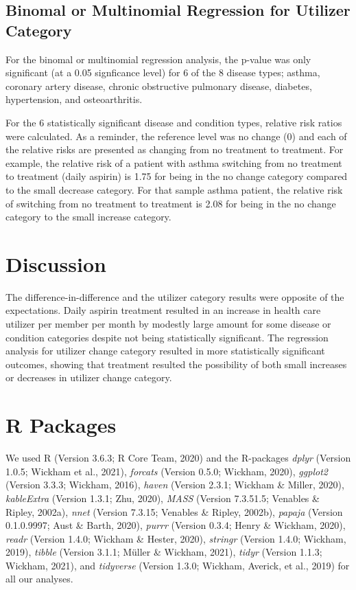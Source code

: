 \documentclass[
  english,
  man]{apa6}
\begin{document}
\hypertarget{binomal-or-multinomial-regression-for-utilizer-category-1}{%
\subsection{Binomal or Multinomial Regression for Utilizer Category}\label{binomal-or-multinomial-regression-for-utilizer-category-1}}

For the binomal or multinomial regression analysis, the p-value was only significant (at a 0.05 signficance level) for 6 of the 8 disease types; asthma, coronary artery disease, chronic obstructive pulmonary disease, diabetes, hypertension, and osteoarthritis.

For the 6 statistically significant disease and condition types, relative risk ratios were calculated. As a reminder, the reference level was no change (0) and each of the relative risks are presented as changing from no treatment to treatment. For example, the relative risk of a patient with asthma switching from no treatment to treatment (daily aspirin) is 1.75 for being in the no change category compared to the small decrease category. For that sample asthma patient, the relative risk of switching from no treatment to treatment is 2.08 for being in the no change category to the small increase category.

\hypertarget{discussion}{%
\section{Discussion}\label{discussion}}

The difference-in-difference and the utilizer category results were opposite of the expectations. Daily aspirin treatment resulted in an increase in health care utilizer per member per month by modestly large amount for some disease or condition categories despite not being statistically significant. The regression analysis for utilizer change category resulted in more statistically significant outcomes, showing that treatment resulted the possibility of both small increases or decreases in utilizer change category.

\newpage

\hypertarget{r-packages}{%
\section{R Packages}\label{r-packages}}

We used R (Version 3.6.3; R Core Team, 2020) and the R-packages \emph{dplyr} (Version 1.0.5; Wickham et al., 2021), \emph{forcats} (Version 0.5.0; Wickham, 2020), \emph{ggplot2} (Version 3.3.3; Wickham, 2016), \emph{haven} (Version 2.3.1; Wickham \& Miller, 2020), \emph{kableExtra} (Version 1.3.1; Zhu, 2020), \emph{MASS} (Version 7.3.51.5; Venables \& Ripley, 2002a), \emph{nnet} (Version 7.3.15; Venables \& Ripley, 2002b), \emph{papaja} (Version 0.1.0.9997; Aust \& Barth, 2020), \emph{purrr} (Version 0.3.4; Henry \& Wickham, 2020), \emph{readr} (Version 1.4.0; Wickham \& Hester, 2020), \emph{stringr} (Version 1.4.0; Wickham, 2019), \emph{tibble} (Version 3.1.1; Müller \& Wickham, 2021), \emph{tidyr} (Version 1.1.3; Wickham, 2021), and \emph{tidyverse} (Version 1.3.0; Wickham, Averick, et al., 2019) for all our analyses.
\end{document}
